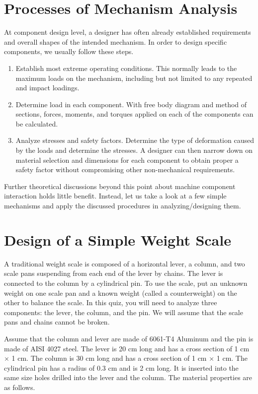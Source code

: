 \documentclass[a4paper,openany,12pt]{book}
\begin{document}
{{\section{Processes of Mechanism Analysis}
\label{processes-of-mechanism-analysis}
At component design level, a designer has often already established
requirements and overall shapes of the intended mechanism. In order to
design specific components, we usually follow these steps.

\begin{enumerate}
\item Establish most extreme operating conditions. This normally leads to
the maximum loads on the mechanism, including but not limited to any
repeated and impact loadings.

\item Determine load in each component. With free body diagram and method
of sections, forces, moments, and torques applied on each of the
components can be calculated.

\item Analyze stresses and safety factors. Determine the type of
deformation caused by the loads and determine the stresses. A
designer can then narrow down on material selection and dimensions
for each component to obtain proper a safety factor without
compromising other non-mechanical requirements.
\end{enumerate}

Further theoretical discussions beyond this point about machine
component interaction holds little benefit. Instead, let us take a look
at a few simple mechanisms and apply the discussed procedures in
analyzing/designing them.

\section{Design of a Simple Weight Scale}
\label{design-of-a-simple-weight-scale}
A traditional weight scale is composed of a horizontal lever, a column,
and two scale pans suspending from each end of the lever by chains. The
lever is connected to the column by a cylindrical pin. To use the scale,
put an unknown weight on one scale pan and a known weight (called a
counterweight) on the other to balance the scale. In this quiz, you will
need to analyze three components: the lever, the column, and the pin. We
will assume that the scale pans and chains cannot be broken.


Assume that the column and lever are made of 6061-T4 Aluminum and the
pin is made of AISI 4027 steel. The lever is 20 cm long and has a cross
section of 1 cm \(\times\) 1 cm. The column is 30 cm long and has a cross
section of 1 cm \(\times\) 1 cm. The cylindrical pin has a radius of 0.3
cm and is 2 cm long. It is inserted into the same size holes drilled
into the lever and the column. The material properties are as follows.


}}
\end{document}

